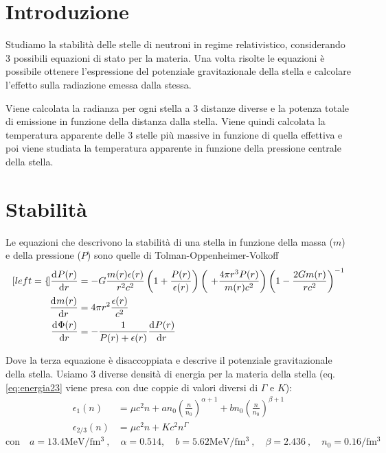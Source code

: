 \documentclass[a4paper, titlepage]{article}
\begin{document}
\tableofcontents
\newpage

\section{Introduzione}
Studiamo la stabilità delle stelle di neutroni in regime relativistico,
considerando 3 possibili equazioni di stato per la materia.
Una volta risolte le equazioni è possibile ottenere l'espressione del potenziale
gravitazionale della stella e calcolare l'effetto sulla radiazione emessa dalla
stessa.


Viene calcolata la radianza per ogni stella a 3 distanze diverse e la potenza
totale di emissione in funzione della distanza dalla stella.
Viene quindi calcolata la temperatura apparente delle 3 stelle più massive in
funzione di quella effettiva e poi viene studiata la temperatura apparente in 
funzione della pressione centrale della stella.


\section{Stabilità}

Le equazioni che descrivono la stabilità di una stella in funzione della massa
($m$) e della pressione ($P$) sono quelle di Tolman-Oppenheimer-Volkoff
\begin{subequations}
\begin{align}[left = {\empheqlbrace}]
    \dv[]{P(r)}{r} &= - G \frac{m(r) \epsilon (r)}{r^2 c^2}
    \left(1 + \frac{P(r)}{\epsilon (r)} \right)
    \left(\ + \frac{4 \pi r^3 P(r)}{m(r) c^2} \right)
    \left(1 - \frac{2 G m(r)}{r c^2} \right)^{-1} \label{eq:P_corr} \\
    \dv[]{m(r)}{r} &= 4 \pi r^2 \frac{\epsilon (r)}{c^2} \label{eq:m_corr} \\
    \dv[]{\Phi(r)}{r} &= - \frac{1}{P(r) + \epsilon (r)} \dv[]{P(r)}{r}
    \label{eq:Phi_corr}
\end{align}
\label{eq:sistema_corr}
\end{subequations}

Dove la terza equazione è disaccoppiata e descrive il potenziale gravitazionale
della stella.
Usiamo 3 diverse densità di energia per la materia della stella (eq.
\ref{eq:energia23} viene presa con due coppie di valori diversi di $\Gamma$ e
$K$):
\begin{subequations}
\begin{align}
    \epsilon_1 (n) &= \mu c^2 n
    + a n_0 \left( \frac{n}{n_0} \right) ^{\alpha + 1}
    + b n_0 \left( \frac{n}{n_0} \right) ^{\beta + 1} \label{eq:energia1} \\
    \epsilon_{2/3} (n) &= \mu c^2n+Kc^2n^\Gamma \label{eq:energia23}
\end{align}
\end{subequations}
\begin{equation}
    \text{con} \quad a = 13.4 \unit{\mega\electronvolt\per\femto\cubic\meter} \ , \quad
    \alpha = 0.514, \quad
    b = 5.62 \unit{\mega\electronvolt\per\femto\cubic\meter} \ , \quad
    \beta = 2.436 \ , \quad
    n_0 = 0.16 \unit{\per\femto\cubic\meter}
\end{equation}
\end{document}
